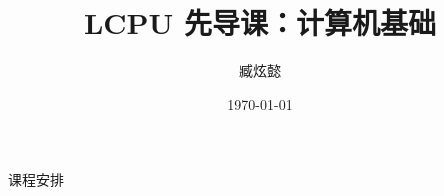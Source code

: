 \documentclass{beamer}
\title{LCPU 先导课：计算机基础}
\author{臧炫懿}
\institute{北京大学 信息科学技术学院}
\date{\today}
\begin{document}
\frame{\titlepage}

\begin{frame}{课程安排}
    \tableofcontents
\end{frame}
\end{document}
